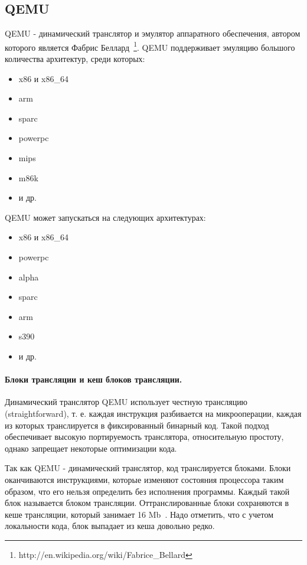 \subsection{QEMU}\label{qemu}

QEMU - динамический транслятор и эмулятор аппаратного обеспечения, автором которого является Фабрис Беллард~\footnote{http://en.wikipedia.org/wiki/Fabrice\_Bellard}. QEMU поддерживает эмуляцию большого количества архитектур, среди которых:

\begin{itemize}
    \item x86 и x86\_64
    \item arm
    \item sparc
    \item powerpc
    \item mips
    \item m86k
    \item и др.
\end{itemize}

QEMU может запускаться на следующих архитектурах:

\begin{itemize}
    \item x86 и x86\_64
    \item powerpc
    \item alpha
    \item sparc
    \item arm
    \item s390
    \item и др.
\end{itemize}

\paragraph{Блоки трансляции и кеш блоков трансляции.} Динамический транслятор QEMU использует честную трансляцию (straightforward), т. е. каждая инструкция разбивается на микрооперации, каждая из которых транслируется в фиксированный бинарный код. Такой подход обеспечивает высокую портируемость транслятора, относительную простоту, однако запрещает некоторые оптимизации кода.

Так как QEMU - динамический транслятор, код транслируется блоками. Блоки оканчиваются инструкциями, которые изменяют состояния процессора таким образом, что его нельзя определить без исполнения программы. Каждый такой блок называется блоком трансляции. Оттранслированные блоки сохраняются в кеше трансляции, который занимает 16 Mb~\cite{qemu}. Надо отметить, что с учетом локальности кода, блок выпадает из кеша довольно редко.

